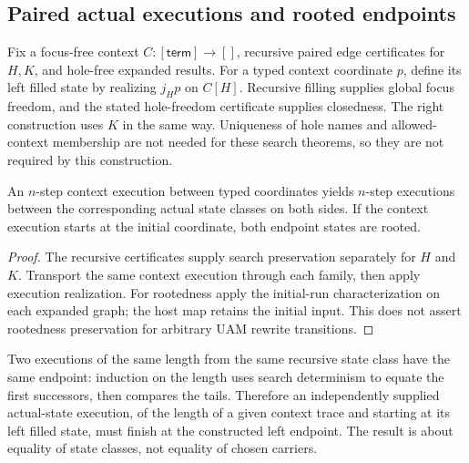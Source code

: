 \subsection{Paired actual executions and rooted endpoints}
Fix a focus-free context $C:[\mathsf{term}]\to[]$, recursive paired edge
certificates for $H,K$, and hole-free expanded results. For a typed context
coordinate $p$, define its left filled state by realizing $j_Hp$ on $C[H]$.
Recursive filling supplies global focus freedom, and the stated hole-freedom
certificate supplies closedness. The right construction uses $K$ in the same
way. Uniqueness of hole names and allowed-context membership are not needed
for these search theorems, so they are not required by this construction.
\begin{theorem}
An $n$-step context execution between typed coordinates yields $n$-step
executions between the corresponding actual state classes on both sides.
If the context execution starts at the initial coordinate, both endpoint
states are rooted.
\end{theorem}
\begin{proof}
The recursive certificates supply search preservation separately for $H$ and
$K$. Transport the same context execution through each family, then apply
execution realization. For rootedness apply the initial-run characterization
on each expanded graph; the host map retains the initial input. This does not
assert rootedness preservation for arbitrary UAM rewrite transitions.
\end{proof}
Two executions of the same length from the same recursive state class have
the same endpoint: induction on the length uses search determinism to equate
the first successors, then compares the tails. Therefore an independently
supplied actual-state execution, of the length of a given context trace and
starting at its left filled state, must finish at the constructed left endpoint.
The result is about equality of state classes, not equality of chosen carriers.

